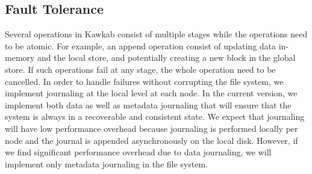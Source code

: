 \documentclass[]{article}
\begin{document}
%
%
%
%
%
\subsection{Fault Tolerance}

Several operations in Kawkab consist of multiple stages while the operations need 
to be atomic. For example, an append operation consist of updating data in-memory and
the local store, and potentially creating a new block in the global store. If such
operations fail at any stage, the whole operation need to be cancelled. In order
to handle failures without corrupting the file system, we implement journaling
at the local level at each node. In the current version, we implement both
data as well as metadata journaling that will ensure that the system is always
in a recoverable and consistent state. We expect that journaling will have low
performance overhead because journaling is performed locally per node and the
journal is appended asynchronously on the local disk. However, if we find significant
performance overhead due to data journaling, we will implement only metadata journaling
in the file system.
\end{document}
